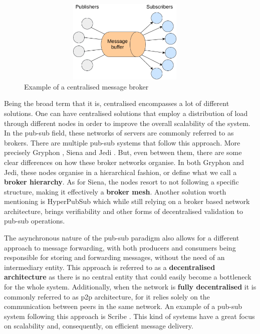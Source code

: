 \begin{figure}[hb!]
  \centering
  \includegraphics[max height=4cm,max width=0.95\textwidth]{../images/centralised-topology.png}
  \caption{Example of a centralised message broker}
  \label{fig:centralised-topology}
\end{figure}

Being the broad term that it is, centralised encompasses a lot of different
solutions.  One can have centralised solutions that employ a distribution of
load through different nodes in order to improve the overall scalability of the
system. In the pub-sub field, these networks of servers are commonly referred
to as brokers. There are multiple pub-sub systems that follow this approach.
More precisely Gryphon \cite{Strom1998}, Siena \cite{Carzaniga2003} and Jedi
\cite{Cugola2001}. But, even between them, there are some clear differences on
how these broker networks organise. In both Gryphon and Jedi, these nodes
organise in a hierarchical fashion, or define what we call a \textbf{broker
hierarchy}. As for Siena, the nodes resort to not following a specific
structure, making it effectively a \textbf{broker mesh}. Another solution worth mentioning is HyperPubSub \cite{Zupan2017} which while still relying on a
broker based network architecture, brings verifiability and other forms of
decentralised validation to pub-sub operations.

The asynchronous nature of the pub-sub paradigm also allows for a different
approach to message forwarding, with both producers and consumers being
responsible for storing and forwarding messages, without the need of an
intermediary entity. This approach is referred to as a \textbf{decentralised
architecture} as there is no central entity that could easily become a
bottleneck for the whole system. Additionally, when the network is
\textbf{fully decentralised} it is commonly referred to as \acrfull{p2p}
architecture, for it relies solely on the communication between peers in the
same network.  An example of a pub-sub system following this approach is Scribe
\cite{Castro2002}.  This kind of systems have a great focus on scalability and,
consequently, on efficient message delivery.

